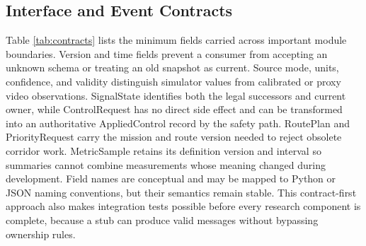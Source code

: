 \subsection{Interface and Event Contracts}

Table \ref{tab:contracts} lists the minimum fields carried across important module boundaries. Version and time fields prevent a consumer from accepting an unknown schema or treating an old snapshot as current. Source mode, units, confidence, and validity distinguish simulator values from calibrated or proxy video observations. SignalState identifies both the legal successors and current owner, while ControlRequest has no direct side effect and can be transformed into an authoritative AppliedControl record by the safety path. RoutePlan and PriorityRequest carry the mission and route version needed to reject obsolete corridor work. MetricSample retains its definition version and interval so summaries cannot combine measurements whose meaning changed during development. Field names are conceptual and may be mapped to Python or JSON naming conventions, but their semantics remain stable. This contract-first approach also makes integration tests possible before every research component is complete, because a stub can produce valid messages without bypassing ownership rules.

